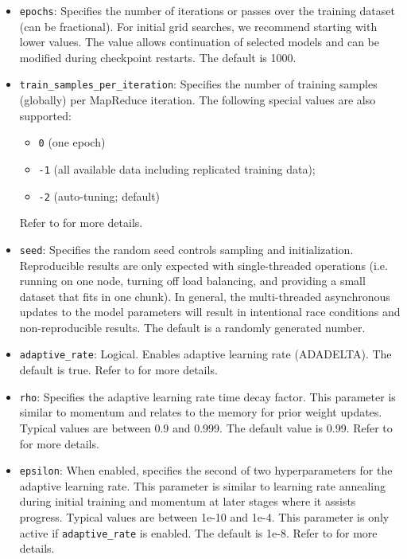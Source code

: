 {{\begin{itemize}
\item \texttt{epochs}: Specifies the number of iterations or passes over the training dataset (can be fractional). For initial grid searches, we recommend starting with lower values. The value allows continuation of selected models and can be modified during checkpoint restarts. The default is 1000.

\item \texttt{train\_samples\_per\_iteration}: Specifies the number of training samples (globally) per MapReduce iteration. The following special values are also supported: 
\begin{itemize}
\item \texttt{0} (one epoch)
\item \texttt{-1} (all available data including replicated training data);
\item \texttt{-2} (auto-tuning; default)
\end{itemize}
Refer to {\textbf{}} for more details.

\item \texttt{seed}: Specifies the random seed controls sampling and initialization. Reproducible results are only expected with single-threaded operations (i.e. running on one node, turning off load balancing, and providing a small dataset that fits in one chunk).  In general, the multi-threaded asynchronous updates to the model parameters will result in intentional race conditions and non-reproducible results.  The default is a randomly generated number.

\item \texttt{adaptive\_rate}: Logical.  Enables adaptive learning rate (ADADELTA). The default is true. Refer to {\textbf{}} for more details.

\item \texttt{rho}: Specifies the adaptive learning rate time decay factor. This parameter is similar to momentum and relates to the memory for prior weight updates. Typical values are between 0.9 and 0.999. The default value is 0.99. %
Refer to {\textbf{}} for more details. 

\item \texttt{epsilon}: When enabled, specifies the second of two hyperparameters for the adaptive learning rate. This parameter is similar to learning rate annealing during initial training and momentum at later stages where it assists progress. Typical values are between 1e-10 and 1e-4. This parameter is only active if \texttt{adaptive\_rate} is enabled. The default is 1e-8. %
Refer to {\textbf{}} for more details.


\end{itemize}}}
